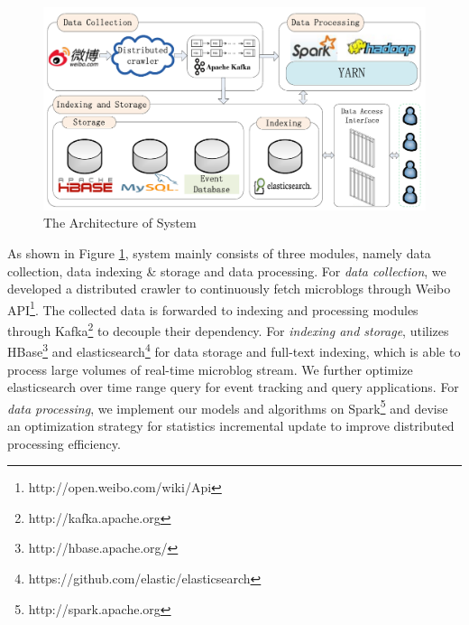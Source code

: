 

\begin{figure}[!t]
\centering
\includegraphics[scale=0.47]{system_architecture.pdf}
\centering
\caption{The Architecture of \ring System}
\label{fig:system_architecture}
\end{figure}

As shown in Figure \ref{fig:system_architecture},
\ring system mainly consists of three modules, namely data collection, data indexing \& storage and data processing.
For \emph{data collection}, we developed a distributed crawler to continuously fetch microblogs through Weibo API\footnote{http://open.weibo.com/wiki/Api}.
The collected data is forwarded to indexing and processing modules through Kafka\footnote{http://kafka.apache.org} to decouple their dependency.
For \emph{indexing and storage}, \ring utilizes HBase\footnote{http://hbase.apache.org/} and elasticsearch\footnote{https://github.com/elastic/elasticsearch} for data storage and full-text indexing, which is able to process large volumes of real-time microblog stream.
We further optimize elasticsearch over time range query for event tracking and query applications.
For \emph{data processing}, we implement our models and algorithms on Spark\footnote{http://spark.apache.org} and
 devise an optimization strategy for statistics incremental update to improve distributed processing efficiency.
